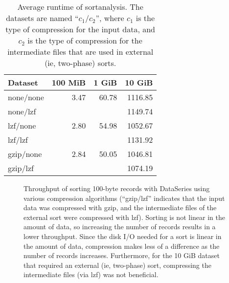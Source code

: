 \begin{table*}
\centering
\begin{tabular}{|l|r|r|r|}\hline

Dataset    & 100 MiB & 1 GiB  & 10 GiB \\
\hline
none/none   & 3.47  & 60.78  & 1116.85 \\
none/lzf    &       &        & 1149.74 \\
lzf/none    & 2.80  & 54.98  & 1052.67 \\
lzf/lzf     &       &        & 1131.92 \\
gzip/none   & 2.84  & 50.05  & 1046.81 \\
gzip/lzf    &       &        & 1074.19 \\
\hline
\end{tabular}

\caption{Average runtime of sortanalysis. The datasets are named ``$c_1$/$c_2$'', where $c_1$ is the type of compression for the input data, and $c_2$ is the type of compression for the intermediate files that are used in external (ie, two-phase) sorts.}

\label{table:sort:runtime}
\end{table*}

\begin{figure}
\caption{Throughput of sorting 100-byte records with DataSeries using various compression algorithms (``gzip/lzf'' indicates that the input data was compressed with gzip, and the intermediate files of the external sort were compressed with lzf). Sorting is not linear in the amount of data, so increasing the number of records results in a lower throughput. Since the disk I/O needed for a sort is linear in the amount of data, compression makes less of a difference as the number of records increases. Furthermore, for the 10 GiB dataset that required an external (ie, two-phase) sort, compressing the intermediate files (via lzf) was not beneficial.}
\label{fig:sort:throughput}
\end{figure}


